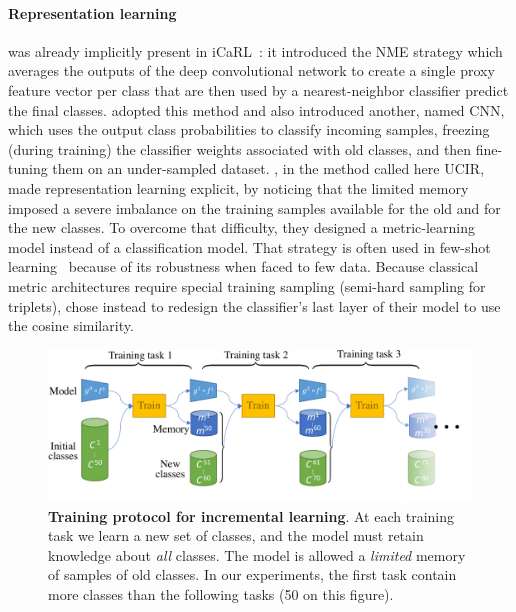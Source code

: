 \paragraph{Representation learning} was already implicitly present in
iCaRL~\citep{rebuffi2017icarl}: it introduced the \acf{NME} strategy which averages the outputs of
the deep convolutional network to create a single proxy feature vector per class that are then used
by a nearest-neighbor classifier predict the final classes. \citet{hou2019ucir} adopted this method
and also introduced another, named CNN, which uses the output class probabilities to classify
incoming samples, freezing (during training) the classifier weights associated with old classes, and
then fine-tuning them on an under-sampled dataset. \citet{hou2019ucir}, in the method called here
UCIR, made representation learning explicit, by noticing that the limited memory imposed a severe
imbalance on the training samples available for the old and for the new classes. To overcome that
difficulty, they designed a metric-learning model instead of a classification model. That strategy
is often used in few-shot learning~\citep{gidaris2018fewshot_wo_forgetting} because of its
robustness when faced to few data. Because classical metric architectures require special training
sampling (\eg semi-hard sampling for triplets), \citet{luo2018cosine_classifier} chose instead to
redesign the classifier's last layer of their model to use the cosine similarity.


\begin{figure}[tb]
    \begin{center}
        \includegraphics[width=1.0\linewidth]{images/podnet/protocol}
    \end{center}
    \caption{\textbf{Training protocol for incremental learning}. At each training task we learn a
        new set of classes, and the model must retain knowledge about \textit{all} classes. The
        model is allowed a \textit{limited} memory of samples of old classes. In our experiments,
        the first task contain more classes than the following tasks (50  on this figure).}
    \label{fig:podnet_protocol}
\end{figure}


